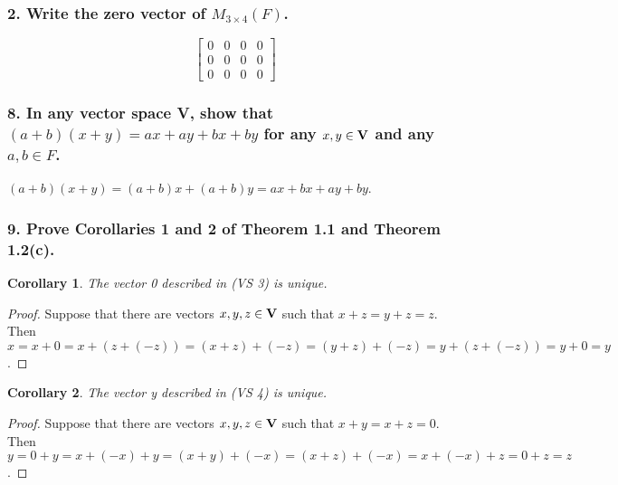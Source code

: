 \documentclass{article}
\newtheorem*{corollary}{Corollary}
\begin{document}
\subsubsection*{2. Write the zero vector of $M_{3 \times 4}(F)$.}
\[\begin{bmatrix}
	0 & 0 & 0 & 0 \\
	0 & 0 & 0 & 0 \\
	0 & 0 & 0 & 0
\end{bmatrix}\]

\subsubsection*{8. In any vector space \textbf{V}, show that $(a + b)(x + y) = ax + ay + bx + by$ for any $x, y \in \textbf{\textup{V}}$ and any $a, b \in F$.}
$(a + b)(x + y) = (a + b)x + (a + b)y = ax + bx + ay + by$.

\subsubsection*{9. Prove Corollaries 1 and 2 of Theorem 1.1 and Theorem 1.2(c).}
\begin{corollary}
	The vector 0 described in (VS 3) is unique.
\end{corollary}
\begin{proof}
	Suppose that there are vectors $x, y, z \in \textbf{\textup{V}}$ such that $x + z = y + z = z$. Then $x = x + 0 = x + (z + (-z)) = (x + z) + (-z) = (y + z) + (-z) = y + (z + (-z)) = y + 0 = y$.
\end{proof}
\begin{corollary}
	The vector y described in (VS 4) is unique.
\end{corollary}
\begin{proof}
	Suppose that there are vectors $x, y, z \in \textbf{\textup{V}}$ such that $x + y = x + z = 0$. Then $y = 0 + y = x + (-x) + y = (x + y) + (-x) = (x + z) + (-x) = x + (-x) + z = 0 + z = z$.
\end{proof}
\end{document}
